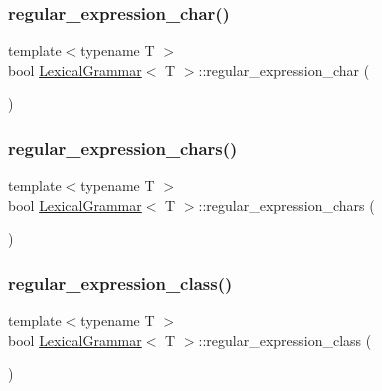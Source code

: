 \subsubsection{\texorpdfstring{regular\+\_\+expression\+\_\+char()}{regular\_expression\_char()}}
{\footnotesize\ttfamily template$<$typename T $>$ \\
bool \hyperlink{class_lexical_grammar}{Lexical\+Grammar}$<$ T $>$\+::regular\+\_\+expression\+\_\+char (\begin{DoxyParamCaption}{ }\end{DoxyParamCaption})\hspace{0.3cm}{\ttfamily [inline]}}

\mbox{\label{class_lexical_grammar_a21d16ea0d1b6b26e45da2e0af6149fbc}} 
\subsubsection{\texorpdfstring{regular\+\_\+expression\+\_\+chars()}{regular\_expression\_chars()}}
{\footnotesize\ttfamily template$<$typename T $>$ \\
bool \hyperlink{class_lexical_grammar}{Lexical\+Grammar}$<$ T $>$\+::regular\+\_\+expression\+\_\+chars (\begin{DoxyParamCaption}{ }\end{DoxyParamCaption})\hspace{0.3cm}{\ttfamily [inline]}}

\mbox{\label{class_lexical_grammar_a4ea2fac37d3c75b080966f3dc0fb9fe4}} 
\subsubsection{\texorpdfstring{regular\+\_\+expression\+\_\+class()}{regular\_expression\_class()}}
{\footnotesize\ttfamily template$<$typename T $>$ \\
bool \hyperlink{class_lexical_grammar}{Lexical\+Grammar}$<$ T $>$\+::regular\+\_\+expression\+\_\+class (\begin{DoxyParamCaption}{ }\end{DoxyParamCaption})\hspace{0.3cm}{\ttfamily [inline]}}

